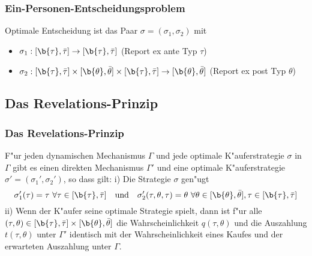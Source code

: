 \begin{frame}
  \frametitle{Ein-Personen-Entscheidungsproblem}
  \justifying
  Optimale Entscheidung ist das Paar $\sigma = (\sigma_{1}, \sigma_{2})$ mit
  \begin{itemize}
    \item $\sigma_{1}: [ \b{\tau} , \bar{\tau} ] \rightarrow [ \b{\tau} , \bar{\tau} ]$ (Report ex ante Typ $\tau$)
    \item $\sigma_{2}: [ \b{\tau} , \bar{\tau} ] \times [ \b{\theta} , \bar{\theta} ]
    \times [ \b{\tau} , \bar{\tau} ]  \rightarrow [ \b{\theta} , \bar{\theta} ]$ (Report ex post Typ $\theta$)
  \end{itemize}
\end{frame}

\subsection{Das Revelations-Prinzip}
\begin{frame}
  \frametitle{Das Revelations-Prinzip}
  \justifying
  \begin{thmP}
    F"ur jeden dynamischen Mechanismus $\Gamma$ und jede optimale K"auferstrategie $\sigma$ in $\Gamma$ gibt es
    einen direkten Mechanismus $\Gamma'$ und eine optimale K"auferstrategie $\sigma' =(\sigma_{1}', \sigma_{2}')$, so dass gilt: \newline \newline
    i) Die Strategie $\sigma$ gen"ugt
    \begin{equation*}
      \sigma_{1}' (\tau) = \tau \ \forall  \tau \in [\b{\tau} , \bar{\tau} ]
      \quad \text{und} \quad
      \sigma_{2}' (\tau, \theta, \tau) = \theta \ \forall  \theta \in [\b{\theta} , \bar{\theta} ], \tau \in [\b{\tau} , \bar{\tau} ]
    \end{equation*}
    ii) Wenn der K"aufer seine optimale Strategie spielt, dann ist f"ur alle
    $(\tau, \theta) \in [\b{\tau} , \bar{\tau} ] \times [\b{\theta} , \bar{\theta} ] $ die
    Wahrscheinlichkeit $q( \tau, \theta)$ und die Auszahlung $t(\tau, \theta)$ unter $\Gamma'$ identisch mit der
    Wahrscheinlichkeit eines Kaufes und der erwarteten Auszahlung unter $\Gamma$.
  \end{thmP}
\end{frame}

